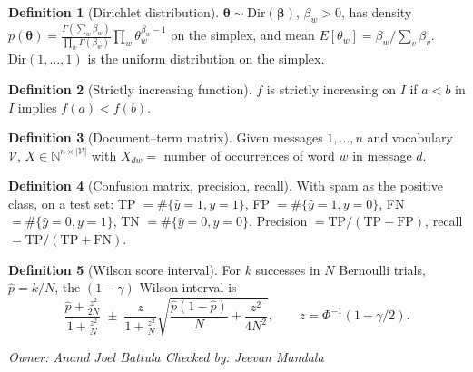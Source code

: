 \documentclass[11pt]{article}
\newcommand{\owner}[2]{\par\noindent\textit{Owner: #1 \hfill Checked by: #2}\par\medskip}
\theoremstyle{plain}
\theoremstyle{definition}
\newtheorem{definition}{Definition}
\newcommand{\N}{\mathbb{N}}
\newcommand{\V}{\mathcal{V}}
\newcommand{\Vs}{|\mathcal{V}|}
\begin{document}
\begin{definition}[Dirichlet distribution]
$\boldsymbol\theta\sim\mathrm{Dir}(\boldsymbol\beta)$, $\beta_w>0$, has density
$p(\boldsymbol\theta)=\frac{\Gamma(\sum_w\beta_w)}{\prod_w\Gamma(\beta_w)}\prod_w\theta_w^{\beta_w-1}$
on the simplex, and mean $E[\theta_w]=\beta_w/\sum_v\beta_v$.
$\mathrm{Dir}(1,\dots,1)$ is the uniform distribution on the simplex.
\end{definition}

\begin{definition}[Strictly increasing function]
$f$ is strictly increasing on $I$ if $a<b$ in $I$ implies $f(a)<f(b)$.
\end{definition}

\begin{definition}[Document--term matrix]
Given messages $1,\dots,n$ and vocabulary $\V$, $X\in\N^{n\times\Vs}$ with $X_{dw}=$ number of
occurrences of word $w$ in message $d$.
\end{definition}

\begin{definition}[Confusion matrix, precision, recall]
With spam as the positive class, on a test set:
TP $=\#\{\hat y=1,y=1\}$, FP $=\#\{\hat y=1,y=0\}$, FN $=\#\{\hat y=0,y=1\}$,
TN $=\#\{\hat y=0,y=0\}$. Precision $=\mathrm{TP}/(\mathrm{TP}+\mathrm{FP})$,
recall $=\mathrm{TP}/(\mathrm{TP}+\mathrm{FN})$.
\end{definition}

\begin{definition}[Wilson score interval]
For $k$ successes in $N$ Bernoulli trials, $\hat p=k/N$, the $(1-\gamma)$ Wilson interval is
\[
\frac{\hat p+\frac{z^2}{2N}}{1+\frac{z^2}{N}}\;\pm\;
\frac{z}{1+\frac{z^2}{N}}\sqrt{\frac{\hat p(1-\hat p)}{N}+\frac{z^2}{4N^2}},
\qquad z=\Phi^{-1}(1-\gamma/2).
\]
\end{definition}
\owner{Anand Joel Battula}{Jeevan Mandala}

\end{document}
